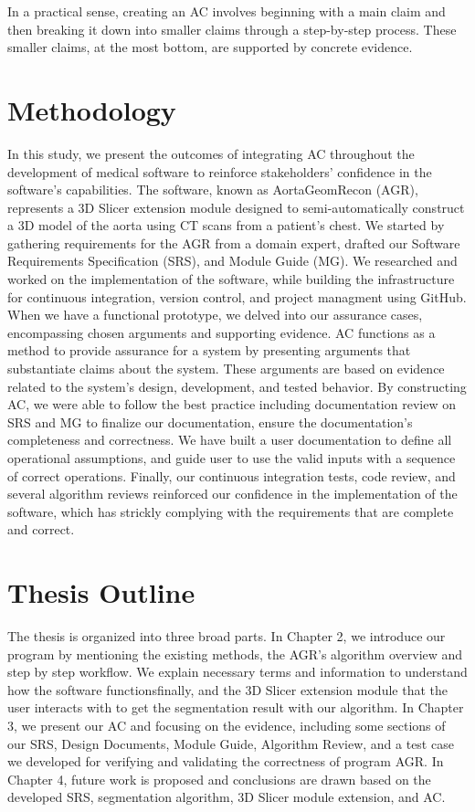 In a practical sense, creating an AC involves beginning with a main claim and then breaking it down into smaller claims through a step-by-step process. These smaller claims, at the most bottom, are supported by concrete evidence.


\section{Methodology} \label{methodology}
In this study, we present the outcomes of integrating AC throughout the development of medical software to reinforce stakeholders' confidence in the software's capabilities. The software, known as AortaGeomRecon (AGR), represents a 3D Slicer \cite{Kikinis2014} extension module designed to semi-automatically construct a 3D model of the aorta using CT scans from a patient's chest. We started by gathering requirements for the AGR from a domain expert, drafted our Software Requirements Specification (SRS), and Module Guide (MG). We researched and worked on the implementation of the software, while building the infrastructure for continuous integration, version control, and project managment using GitHub. When we have a functional prototype, we delved into our assurance cases, encompassing chosen arguments and supporting evidence. AC functions as a method to provide assurance for a system by presenting arguments that substantiate claims about the system. These arguments are based on evidence related to the system's design, development, and tested behavior. By constructing AC, we were able to follow the best practice including documentation review on SRS and MG to finalize our documentation, ensure the documentation's completeness and correctness. We have built a user documentation to define all operational assumptions, and guide user to use the valid inputs with a sequence of correct operations. Finally, our continuous integration tests, code review, and several algorithm reviews reinforced our confidence in the implementation of the software, which has strickly complying with the requirements that are complete and correct.

\section{Thesis Outline} \label{TO}

The thesis is organized into three broad parts. In Chapter 2, we introduce our program \progname{} by mentioning the existing methods, the AGR's algorithm overview and step by step  workflow. We explain necessary terms and information to understand how the software functionsfinally, and the 3D Slicer \cite{Kikinis2014} extension module that the user interacts with to get the segmentation result with our algorithm. In Chapter 3, we present our AC and focusing on the evidence, including  some sections of our SRS, Design Documents, Module Guide, Algorithm Review, and a test case we developed for verifying and validating the correctness of program AGR. In Chapter 4, future work is proposed and conclusions are drawn based on the developed SRS, segmentation algorithm, 3D Slicer module extension, and AC.